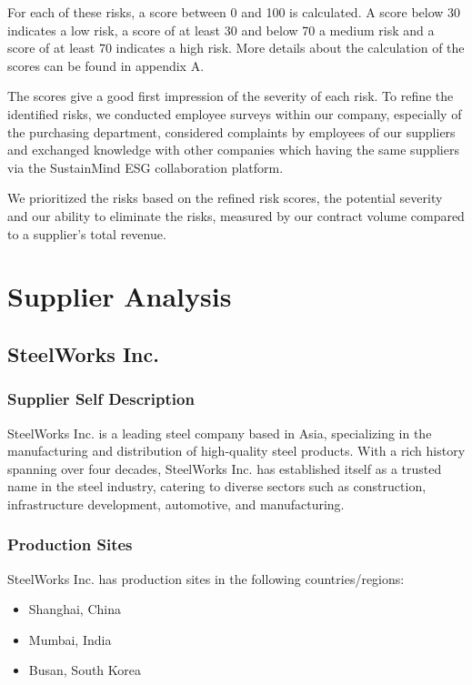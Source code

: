 \documentclass{article}
\begin{document}
For each of these risks, a score between 0 and 100 is calculated. A score below 30 indicates a low risk, a score of at least 30 and below 70 a medium risk and
a score of at least 70 indicates a high risk. More details about the calculation of the scores can be found in appendix A.

The scores give a good first impression of the severity of each risk. To refine the identified risks, we conducted employee surveys within our company, especially
of the purchasing department, considered complaints by employees of our suppliers and exchanged knowledge with other companies which having the same suppliers via the
SustainMind ESG collaboration platform.

We prioritized the risks based on the refined risk scores, the potential severity and our ability to eliminate the risks, measured by our contract volume compared to
a supplier's total revenue.

\section{Supplier Analysis}

\subsection{SteelWorks Inc.}

\subsubsection*{Supplier Self Description}
SteelWorks Inc. is a leading steel company based in Asia, specializing in the manufacturing and distribution of high-quality steel products.
With a rich history spanning over four decades, SteelWorks Inc. has established itself as a trusted name in the steel industry, catering to diverse sectors
such as construction, infrastructure development, automotive, and manufacturing.

\subsubsection*{Production Sites}
SteelWorks Inc. has production sites in the following countries/regions:
\begin{itemize}
    \item Shanghai, China
    \item Mumbai, India
    \item Busan, South Korea
\end{itemize}
\end{document}
